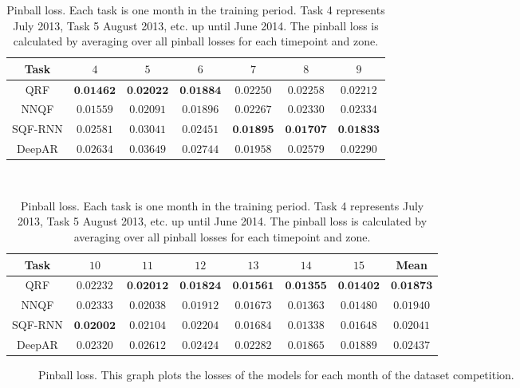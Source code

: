 \begin{table}[ht]%
    \footnotesize
    \hspace*{25pt} %
    \begin{minipage}{\textwidth}
    \renewcommand{\b}[1]{\textbf{#1}}
    \begin{tabular}{c|cccccc}
        \toprule \noalign{\smallskip}
        Task & \(4\) & \(5\) & \(6\) & \(7\) & \(8\) & \(9\) \\
        \midrule
        QRF     & \(\b{0.01462}\) & \(\b{0.02022}\) & \(\b{0.01884}\) & \(0.02250\)     & \(0.02258\)     & \(0.02212\)     \\
        NNQF    & \(0.01559\)     & \(0.02091\)     & \(0.01896\)     & \(0.02267\)     & \(0.02330\)     & \(0.02334\)     \\
        SQF-RNN & \(0.02581\)     & \(0.03041\)     & \(0.02451\)     & \(\b{0.01895}\) & \(\b{0.01707}\) & \(\b{0.01833}\) \\
        DeepAR  & \(0.02634\)     & \(0.03649\)     & \(0.02744\)     & \(0.01958\)     & \(0.02579\)     & \(0.02290\)     \\
        \bottomrule
    \end{tabular}
    \vspace*{1em} \\
    \begin{tabular}{c|cccccc|c}
        \toprule \noalign{\smallskip}
        Task & \(10\) & \(11\) & \(12\) & \(13\) & \(14\) & \(15\) & Mean \\
        \midrule
        QRF     & \(0.02232\)     & \(\b{0.02012}\) & \(\b{0.01824}\) & \(\b{0.01561}\) & \(\b{0.01355}\) & \(\b{0.01402}\) & \(\b{0.01873}\) \\
        NNQF    & \(0.02333\)     & \(0.02038\)     & \(0.01912\)     & \(0.01673\)     & \(0.01363\)     & \(0.01480\)     & \(0.01940\)     \\
        SQF-RNN & \(\b{0.02002}\) & \(0.02104\)     & \(0.02204\)     & \(0.01684\)     & \(0.01338\)     & \(0.01648\)     & \(0.02041\)     \\
        DeepAR  & \(0.02320\)     & \(0.02612\)     & \(0.02424\)     & \(0.02282\)     & \(0.01865\)     & \(0.01889\)     & \(0.02437\)     \\
        \bottomrule
    \end{tabular}
    \end{minipage}

    \caption[Pinball loss]{Pinball loss. 
    Each task is one month in the training period. 
    Task 4 represents July 2013, Task 5 August 2013, etc. up until June 2014.
    The pinball loss is calculated by averaging 
    over all pinball losses for each timepoint and zone.}
    \label{table:pinball-loss}
\end{table}

\begin{figure}[ht]
    \centering
    
    \caption[Pinball loss]{Pinball loss. 
    This graph plots the losses of the models for each month of the dataset competition.}
    \label{fig:pinball-loss}
\end{figure}